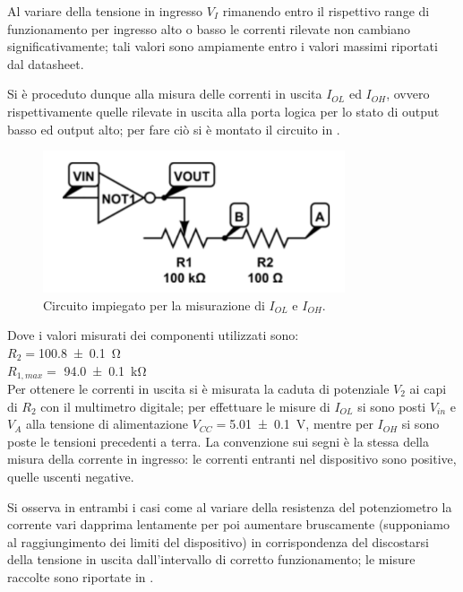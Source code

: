 	Al variare della tensione in ingresso $V_{I}$ rimanendo entro il rispettivo range di funzionamento per ingresso alto o basso le correnti rilevate non cambiano significativamente; tali valori sono ampiamente entro i valori massimi riportati dal datasheet.

	Si è proceduto dunque alla misura delle correnti in uscita $I_{OL}$ ed $I_{OH}$, ovvero rispettivamente quelle rilevate in uscita alla porta logica per lo stato di output basso ed output alto; per fare ciò si è montato il circuito in .

	\begin{figure}[h]
		\centering
		\includegraphics[scale=0.75]{cir2.png}
		\caption{Circuito impiegato per la misurazione di $I_{OL}$ e $I_{OH}$. }
		\label{f:c2}
	\end{figure}

	Dove i valori misurati dei componenti utilizzati sono:\\
	$R_{2}= $\SI{100.8 \pm 0.1}{\ohm}\\
	$R_{1,max}=$ \SI{94.0 \pm 0.1 }{ \kilo \ohm}\\

	Per ottenere le correnti in uscita si è misurata la caduta di potenziale  $V_2$ ai capi di $R_{2}$ con il multimetro digitale; per effettuare le misure di $I_{OL}$ si sono posti $V_{in}$ e $V_A$ alla tensione di alimentazione $V_{CC}=$\SI{5.01 \pm 0.1}{\volt}, mentre per $I_{OH}$ si sono poste le tensioni precedenti a terra. La convenzione sui segni è la
	stessa della misura della corrente in ingresso: le correnti entranti
	nel dispositivo sono positive, quelle uscenti negative.

	Si osserva in entrambi i casi come al variare della resistenza del
	potenziometro la corrente vari dapprima lentamente per poi aumentare
	bruscamente (supponiamo al raggiungimento dei limiti del dispositivo) in
	corrispondenza del discostarsi della tensione in uscita dall'intervallo di
	corretto funzionamento; le misure raccolte sono riportate in .

